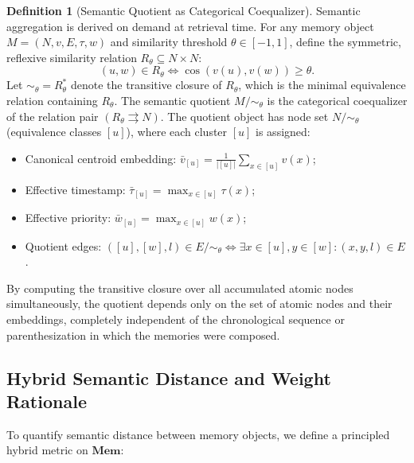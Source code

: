 \documentclass[11pt,a4paper]{article}
\theoremstyle{definition}
\newtheorem{definition}{Definition}[section]
\begin{document}
\begin{definition}[Semantic Quotient as Categorical Coequalizer]
Semantic aggregation is derived on demand at retrieval time. For any memory object $M = (N, v, E, \tau, w)$ and similarity threshold $\theta \in [-1, 1]$, define the symmetric, reflexive similarity relation $R_\theta \subseteq N \times N$:
\[
(u, w) \in R_\theta \iff \cos(v(u), v(w)) \geq \theta.
\]
Let $\sim_\theta = R_\theta^*$ denote the transitive closure of $R_\theta$, which is the minimal equivalence relation containing $R_\theta$. The semantic quotient $M / \sim_\theta$ is the categorical coequalizer of the relation pair $(R_\theta \rightrightarrows N)$. The quotient object has node set $N / \sim_\theta$ (equivalence classes $[u]$), where each cluster $[u]$ is assigned:
\begin{itemize}
    \item Canonical centroid embedding: $\bar{v}_{[u]} = \frac{1}{|[u]|} \sum_{x \in [u]} v(x)$;
    \item Effective timestamp: $\bar{\tau}_{[u]} = \max_{x \in [u]} \tau(x)$;
    \item Effective priority: $\bar{w}_{[u]} = \max_{x \in [u]} w(x)$;
    \item Quotient edges: $([u], [w], l) \in E / \sim_\theta \iff \exists x \in [u], y \in [w] : (x, y, l) \in E$.
\end{itemize}
\end{definition}

By computing the transitive closure over all accumulated atomic nodes simultaneously, the quotient depends only on the set of atomic nodes and their embeddings, completely independent of the chronological sequence or parenthesization in which the memories were composed.

\subsection{Hybrid Semantic Distance and Weight Rationale}

To quantify semantic distance between memory objects, we define a principled hybrid metric on $\mathbf{Mem}$:
\end{document}
